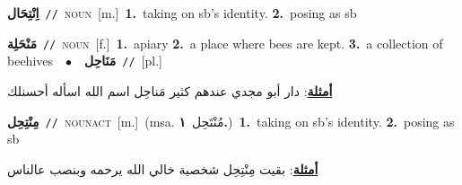 \documentclass[10pt,a4paper,twoside]{article} %
\begin{document}
\begin{multicols}{2}
{\setlength\topsep{0pt}\textbf{\foreignlanguage{arabic}{اِنْتِحَال}}\ {\color{gray}\texttt{//}\color{black}}\ \textsc{noun}\ [m.]\ \textbf{1.}~taking on sb's identity.  \textbf{2.}~posing as sb\ } \vspace{2mm}

{\setlength\topsep{0pt}\textbf{\foreignlanguage{arabic}{مَنْحَلِة}}\ {\color{gray}\texttt{//}\color{black}}\ \textsc{noun}\ [f.]\ \textbf{1.}~apiary  \textbf{2.}~a place where bees are kept.  \textbf{3.}~a collection of beehives\ \ $\bullet$\ \ \setlength\topsep{0pt}\textbf{\foreignlanguage{arabic}{مَنَاحِل}}\ {\color{gray}\texttt{//}\color{black}}\ [pl.]\  \begin{flushright}\color{gray}\foreignlanguage{arabic}{\textbf{\underline{\foreignlanguage{arabic}{أمثلة}}}: دار أبو مجدي عندهم كثير مَناحِل اسم الله اسأله أحسنلك}\end{flushright}\color{black}} \vspace{2mm}

{\setlength\topsep{0pt}\textbf{\foreignlanguage{arabic}{مِنْتِحِل}}\ {\color{gray}\texttt{//}\color{black}}\ \textsc{noun\textunderscore act}\ [m.]\ \color{gray}(msa. \foreignlanguage{arabic}{مُنْتَحِل}~\foreignlanguage{arabic}{\textbf{١.}})\color{black}\ \textbf{1.}~taking on sb's identity.  \textbf{2.}~posing as sb\  \begin{flushright}\color{gray}\foreignlanguage{arabic}{\textbf{\underline{\foreignlanguage{arabic}{أمثلة}}}: بقيت مِنْتِحِل شخصية خالي الله يرحمه وبنصب عالناس}\end{flushright}\color{black}} \vspace{2mm}


\end{multicols}
\end{document}

